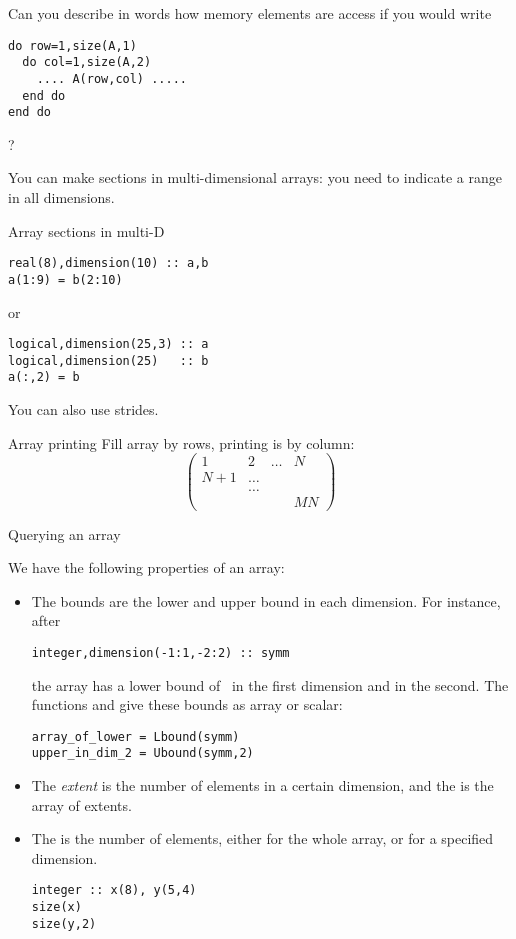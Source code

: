 \begin{exercise}
  Can you describe in words how memory elements are access if you
  would write
\begin{lstlisting}
do row=1,size(A,1)
  do col=1,size(A,2)
    .... A(row,col) .....
  end do
end do
\end{lstlisting}
?
\end{exercise}

You can make sections in multi-dimensional arrays: you need to
indicate a range in all dimensions.

\begin{block}{Array sections in multi-D}
  \label{sl:farray-sectiond}
\begin{lstlisting}
real(8),dimension(10) :: a,b
a(1:9) = b(2:10)
\end{lstlisting}
or
\begin{lstlisting}
logical,dimension(25,3) :: a
logical,dimension(25)   :: b
a(:,2) = b
\end{lstlisting}
You can also use strides.
\end{block}

\begin{block}{Array printing}
  \label{sl:farray-print}
  Fill array by rows, printing is by column:
  \[ \begin{pmatrix}1&2&\ldots&N\\ N+1&\ldots\\ &\ldots\\ &&&MN
  \end{pmatrix}
  \]
  \scriptsize
\end{block}

 {Querying an array}
\label{sec:farray-query}

We have the following properties of an array:
\begin{itemize}
\item The bounds are the lower and upper bound in each dimension.
  For instance, after
\begin{lstlisting}
integer,dimension(-1:1,-2:2) :: symm
\end{lstlisting}
the array  has a lower bound of~ in the first dimension
and  in the second. The functions  and
 give these bounds as array or scalar:
\begin{lstlisting}
array_of_lower = Lbound(symm)
upper_in_dim_2 = Ubound(symm,2)
\end{lstlisting}


\item The \emph{extent} is the number
  of elements in a certain dimension, and the
   is the array of extents.

\item The  is the number of elements, either for
  the whole array, or for a specified dimension.
\begin{lstlisting}
integer :: x(8), y(5,4)
size(x)
size(y,2)
\end{lstlisting}
\end{itemize}

